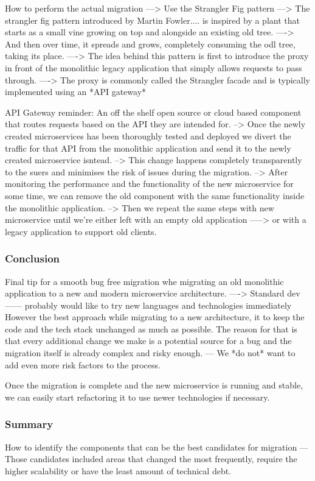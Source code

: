 \documentclass[a4paper, 11pt]{book}
\begin{document}
    How to perform the actual migration
    ---> Use the Strangler Fig pattern
    ---> The strangler fig pattern introduced by Martin Fowler.... is inspired by a plant that starts as a small vine growing on top and alongside an existing old tree.
    ----> And then over time, it spreads and grows, completely consuming the odl tree, taking its place.
    ----> The idea behind this pattern is first to introduce the proxy in front of the monolithic legacy application that simply allows requests to pass through.
    ----> The proxy is commonly called the Strangler facade and is typically implemented using an *API gateway*

    API Gateway reminder: An off the shelf open source or cloud based component that routes requests based on the API they are intended for.
    --> Once the newly created microservices has been thoroughly tested and deployed we divert the traffic for that API from the monolithic application and send it to the newly created microservice isntead.
    --> This change happens completely transparently to the suers and minimises the risk of issues during the migration.
    --> After monitoring the performance and the functionality of the new microservice for some time, we can remove the old component with the same functionality inside the monolithic application.
    --> Then we repeat the same steps with new microservice until we're either left with an empty old application
    -----> or with a legacy application to support old clients.

    \subsubsection{Conclusion}
    Final tip for a smooth bug free migration whe migrating an old monolithic application to a new and modern microservice architecture.
    ----> Standard dev------ probably would like to try new languages and technologies immediately
    However the best approach while migrating to a new architecture, it to keep the code and the tech stack unchanged as much as possible.
    The reason for that is that every additional change we make is a potential source for a bug and the migration itself is already complex and risky enough.
    --- We *do not* want to add even more risk factors to the process.

    Once the migration is complete and the new microservice is running and stable, we can easily start refactoring it to use newer technologies if necessary.

    \subsubsection{Summary}
    How to identify the components that can be the best candidates for migration
    --- Those candidates included areas that changed the most frequently, require the higher scalability or have the least amount of technical debt.
\end{document}
